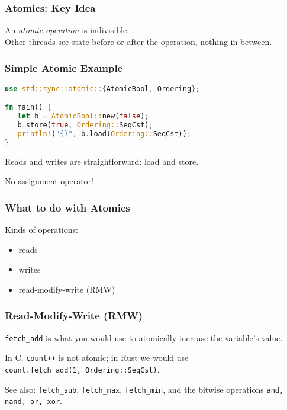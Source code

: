 \begin{frame}[fragile]
  \frametitle{Atomics: Key Idea}
  
    An \emph{atomic operation} is indivisible.\\[1em]
    Other threads see state before or after the operation,
    nothing in between.
  
\end{frame}


\begin{frame}[fragile]
\frametitle{Simple Atomic Example}

\begin{lstlisting}[language=Rust]
use std::sync::atomic::{AtomicBool, Ordering};

fn main() {
   let b = AtomicBool::new(false);
   b.store(true, Ordering::SeqCst);
   println!("{}", b.load(Ordering::SeqCst));
}
\end{lstlisting}

  Reads and writes are straightforward: load and store.

No assignment operator!

\end{frame}


\begin{frame}
  \frametitle{What to do with Atomics}

  

    \Large
    Kinds of operations:
    \begin{itemize}
    \item reads
    \item writes
    \item read-modify-write (RMW)
    \end{itemize}
    
\end{frame}

\begin{frame}
  \frametitle{Read-Modify-Write (RMW)}

  \texttt{fetch\_add} is what you would use to atomically increase the variable's value. 
  
  In C, \texttt{count++} is not atomic; in Rust we would use\\
  \qquad \texttt{count.fetch\_add(1, Ordering::SeqCst)}.

See also: \texttt{fetch\_sub}, \texttt{fetch\_max}, \texttt{fetch\_min}, and the bitwise operations \texttt{and, nand, or, xor}.
  
\end{frame}


